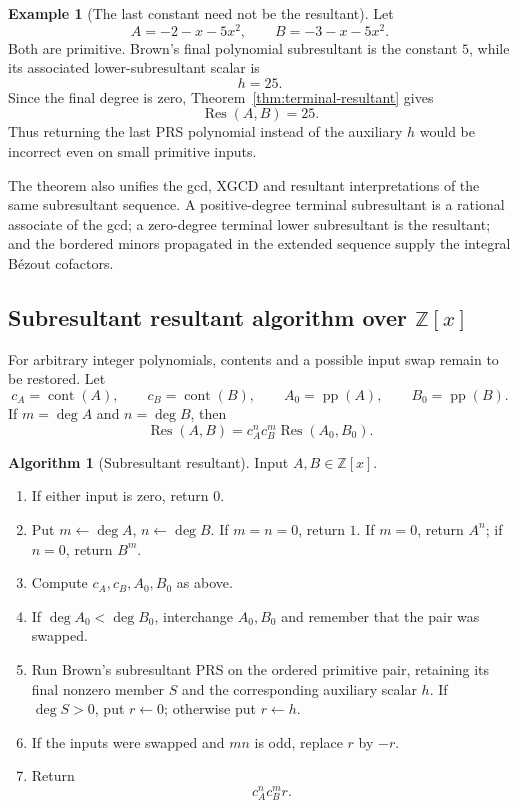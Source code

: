 \documentclass[11pt]{book}
\theoremstyle{definition}
\newtheorem{algorithm}[theorem]{Algorithm}
\newtheorem{example}[theorem]{Example}
\newcommand{\ZZ}{\mathbb Z}
\begin{document}
\begin{example}[The last constant need not be the resultant]
Let
\[
 A=-2-x-5x^2,
 \qquad
 B=-3-x-5x^2.
\]
Both are primitive.  Brown's final polynomial subresultant is the constant
$5$, while its associated lower-subresultant scalar is
\[
 h=25.
\]
Since the final degree is zero, Theorem~\ref{thm:terminal-resultant} gives
\[
 \operatorname{Res}(A,B)=25.
\]
Thus returning the last PRS polynomial instead of the auxiliary $h$ would be
incorrect even on small primitive inputs.
\end{example}

The theorem also unifies the gcd, XGCD and resultant interpretations of the
same subresultant sequence.  A positive-degree terminal subresultant is a
rational associate of the gcd; a zero-degree terminal lower subresultant is
the resultant; and the bordered minors propagated in the extended sequence
supply the integral B\'ezout cofactors.

\subsection{Subresultant resultant algorithm over $\ZZ[x]$}

For arbitrary integer polynomials, contents and a possible input swap remain
to be restored.  Let
\[
 c_A=\operatorname{cont}(A),
 \qquad
 c_B=\operatorname{cont}(B),
 \qquad
 A_0=\operatorname{pp}(A),
 \qquad
 B_0=\operatorname{pp}(B).
\]
If $m=\deg A$ and $n=\deg B$, then
\begin{equation}\label{eq:resultant-content-law}
 \operatorname{Res}(A,B)
 =c_A^n c_B^m\operatorname{Res}(A_0,B_0).
\end{equation}

\begin{algorithm}[Subresultant resultant]
\label{alg:subresultant-resultant}
Input $A,B\in\ZZ[x]$.
\begin{enumerate}
 \item If either input is zero, return $0$.
 \item Put $m\leftarrow\deg A$, $n\leftarrow\deg B$.  If $m=n=0$, return
 $1$.  If $m=0$, return $A^n$; if $n=0$, return $B^m$.
 \item Compute $c_A,c_B,A_0,B_0$ as above.
 \item If $\deg A_0<\deg B_0$, interchange $A_0,B_0$ and remember that the
 pair was swapped.
 \item Run Brown's subresultant PRS on the ordered primitive pair, retaining
 its final nonzero member $S$ and the corresponding auxiliary scalar $h$.
 If $\deg S>0$, put $r\leftarrow0$; otherwise put $r\leftarrow h$.
 \item If the inputs were swapped and $mn$ is odd, replace $r$ by $-r$.
 \item Return
 \begin{equation}\label{eq:resultant-alg-return}
  c_A^n c_B^m r.
 \end{equation}
\end{enumerate}
\end{algorithm}
\end{document}

